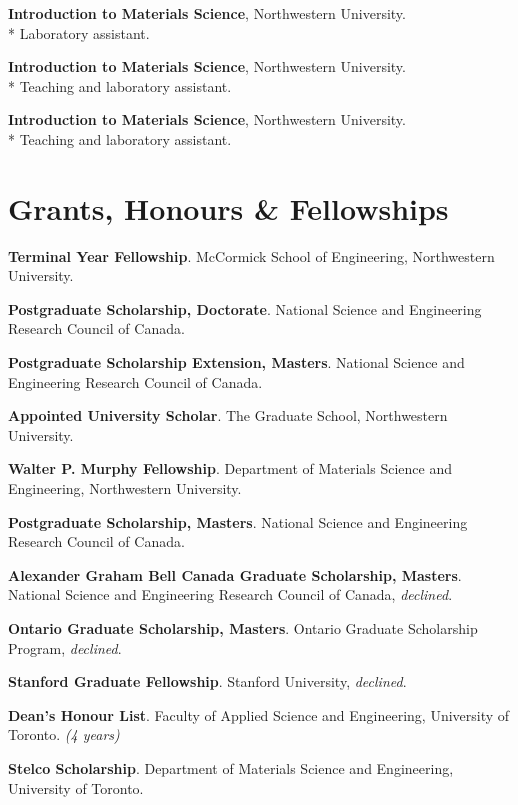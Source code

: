 \textbf{Introduction to Materials Science}, Northwestern University.\\*
Laboratory assistant.

\textbf{Introduction to Materials Science}, Northwestern University.\\*
Teaching and laboratory assistant.

\textbf{Introduction to Materials Science}, Northwestern University.\\*
Teaching and laboratory assistant.
\endgroup

\section*{Grants, Honours \& Fellowships}
\textbf{Terminal Year Fellowship}. McCormick School of Engineering, Northwestern University.

\begingroup\setlength{\parskip}{0.1cm}
\textbf{Postgraduate Scholarship, Doctorate}. National Science and Engineering Research Council of Canada.

\textbf{Postgraduate Scholarship Extension, Masters}. National Science and Engineering Research Council of Canada.

\textbf{Appointed University Scholar}. The Graduate School, Northwestern University.

\textbf{Walter P. Murphy Fellowship}. Department of Materials Science and Engineering, Northwestern University.

\textbf{Postgraduate Scholarship, Masters}. National Science and Engineering Research Council of Canada.

\textbf{Alexander Graham Bell Canada Graduate Scholarship, Masters}. National Science and Engineering Research Council of Canada, \emph{declined}.

\textbf{Ontario Graduate Scholarship, Masters}. Ontario Graduate Scholarship Program, \emph{declined}.

\textbf{Stanford Graduate Fellowship}. Stanford University, \emph{declined}.

\textbf{Dean's Honour List}. Faculty of Applied Science and Engineering, University of Toronto. \emph{(4 years)}

\textbf{Stelco Scholarship}. Department of Materials Science and Engineering, University of Toronto.

